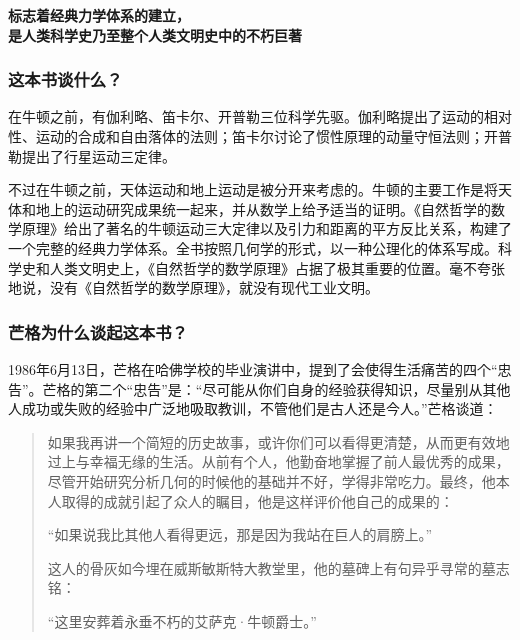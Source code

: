 \cleardoublepage
{}


\begin{BookSummaryBox}
\textbf{标志着经典力学体系的建立，\\是人类科学史乃至整个人类文明史中的不朽巨著}
\par
\end{BookSummaryBox}

\subsubsection*{这本书谈什么？}

在牛顿之前，有伽利略、笛卡尔、开普勒三位科学先驱。伽利略提出了运动的相对性、运动的合成和自由落体的法则；笛卡尔讨论了惯性原理的动量守恒法则；开普勒提出了行星运动三定律。
\par

不过在牛顿之前，天体运动和地上运动是被分开来考虑的。牛顿的主要工作是将天体和地上的运动研究成果统一起来，并从数学上给予适当的证明。《自然哲学的数学原理》给出了著名的牛顿运动三大定律以及引力和距离的平方反比关系，构建了一个完整的经典力学体系。全书按照几何学的形式，以一种公理化的体系写成。科学史和人类文明史上，《自然哲学的数学原理》占据了极其重要的位置。毫不夸张地说，没有《自然哲学的数学原理》，就没有现代工业文明。
\par

\subsubsection*{芒格为什么谈起这本书？}

1986年6月13日，芒格在哈佛学校的毕业演讲中，提到了会使得生活痛苦的四个“忠告”。芒格的第二个“忠告”是：“尽可能从你们自身的经验获得知识，尽量别从其他人成功或失败的经验中广泛地吸取教训，不管他们是古人还是今人。”芒格谈道：
\par

\begin{quotation}
如果我再讲一个简短的历史故事，或许你们可以看得更清楚，从而更有效地过上与幸福无缘的生活。从前有个人，他勤奋地掌握了前人最优秀的成果，尽管开始研究分析几何的时候他的基础并不好，学得非常吃力。最终，他本人取得的成就引起了众人的瞩目，他是这样评价他自己的成果的：
\par

“如果说我比其他人看得更远，那是因为我站在巨人的肩膀上。”
\par

这人的骨灰如今埋在威斯敏斯特大教堂里，他的墓碑上有句异乎寻常的墓志铭：
\par

“这里安葬着永垂不朽的艾萨克·牛顿爵士。”
\par
\end{quotation}

